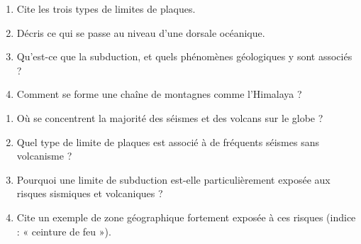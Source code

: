 \begin{enumerate}[label=\arabic*)]
\item Cite les trois types de limites de plaques.
\item Décris ce qui se passe au niveau d'une dorsale océanique.
\item Qu'est-ce que la subduction, et quels phénomènes géologiques y sont associés ?
\item Comment se forme une chaîne de montagnes comme l'Himalaya ?
\end{enumerate}

\begin{enumerate}[label=\arabic*)]
\item Où se concentrent la majorité des séismes et des volcans sur le globe ?
\item Quel type de limite de plaques est associé à de fréquents séismes sans
volcanisme ?
\item Pourquoi une limite de subduction est-elle particulièrement exposée aux risques
sismiques et volcaniques ?
\item Cite un exemple de zone géographique fortement exposée à ces risques (indice :
« ceinture de feu »).
\end{enumerate}

